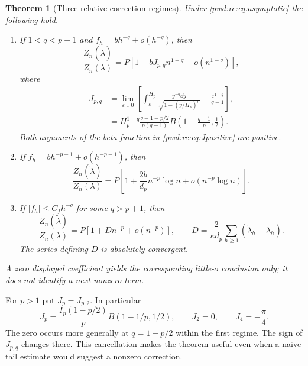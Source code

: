 \documentclass[11pt,letterpaper]{article}
\numberwithin{equation}{section}
\newtheorem{theorem}{Theorem}[section]
\theoremstyle{remark}\newtheorem{remark}[theorem]{Remark}
\begin{document}
\begin{theorem}[Three relative correction regimes]\label{pwd:rc:thm:three}
Under \eqref{pwd:rc:eq:asymptotic} the following hold.
\begin{enumerate}[label=(\roman*),leftmargin=*]
\item If $1<q<p+1$ and $f_h=b h^{-q}+o(h^{-q})$, then
\begin{equation}\label{pwd:rc:eq:bulk}
 \frac{Z_n(\widetilde\lambda)}{Z_n(\lambda)}
 =P\left[1+bJ_{p,q}n^{1-q}+o(n^{1-q})\right],
\end{equation}
where
\begin{align}
 J_{p,q}&=\lim_{\varepsilon\downarrow0}
 \left[\int_\varepsilon^{H_p}
 \frac{y^{-q}\dd y}{\sqrt{1-(y/H_p)^p}}
 -\frac{\varepsilon^{1-q}}{q-1}\right],\label{pwd:rc:eq:Jreg}\\
 &=H_p^{1-q}\frac{q-1-p/2}{p(q-1)}
 B\left(1-\frac{q-1}{p},\frac12\right).\label{pwd:rc:eq:Jpositive}
\end{align}
Both arguments of the beta function in \eqref{pwd:rc:eq:Jpositive} are positive.
\item If $f_h=b h^{-p-1}+o(h^{-p-1})$, then
\begin{equation}\label{pwd:rc:eq:critical}
 \frac{Z_n(\widetilde\lambda)}{Z_n(\lambda)}
 =P\left[1+\frac{2b}{d_p}n^{-p}\log n+o(n^{-p}\log n)\right].
\end{equation}
\item If $|f_h|\le C_f h^{-q}$ for some $q>p+1$, then
\begin{equation}\label{pwd:rc:eq:endpoint-regime}
 \frac{Z_n(\widetilde\lambda)}{Z_n(\lambda)}
 =P\left[1+D n^{-p}+o(n^{-p})\right],\qquad
 D=\frac2{\kappa d_p}\sum_{h\ge1}(\widetilde\lambda_h-\lambda_h).
\end{equation}
The series defining $D$ is absolutely convergent.
\end{enumerate}
A zero displayed coefficient yields the corresponding little-$o$ conclusion only; it does not identify a next nonzero term.
\end{theorem}
For $p>1$ put $J_p=J_{p,2}$. In particular
\begin{equation}\label{pwd:rc:eq:Jp}
 J_p=\frac{I_p(1-p/2)}p B(1-1/p,1/2),\qquad
 J_2=0,\qquad J_4=-\frac\pi4.
\end{equation}
The zero occurs more generally at $q=1+p/2$ within the first regime. The sign of $J_{p,q}$ changes there. This cancellation makes the theorem useful even when a naive tail estimate would suggest a nonzero correction.
\end{document}
